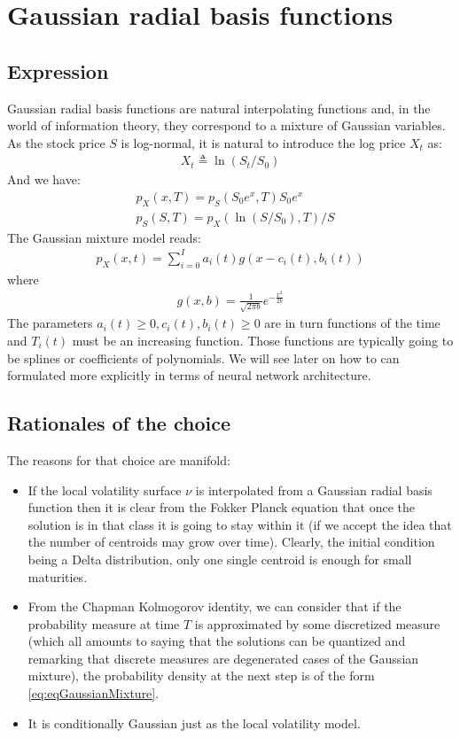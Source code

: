 \documentclass[10pt,a4paper]{article}
\begin{document}
\section{Gaussian radial basis functions}
\subsection{Expression}
Gaussian radial basis functions are natural interpolating functions and, in the world of information theory, they correspond to a mixture of Gaussian variables. 
As the stock price $S$ is log-normal, it is natural to introduce the log price $X_t$ as:
\begin{align}
X_t \triangleq  \ln(S_t/S_0)
\end{align}
And we have:
\begin{align}
&p_X(x,T) = p_S(S_0 e^x,T) S_0 e^x\\
&p_S(S,T) = p_X(\ln(S/S_0),T)/S
\end{align}
The Gaussian mixture model reads:
\begin{align}\label{eq:eqGaussianMixture}
p_X(x,t) = \sum_{i=0}^{I} a_i(t) g(x-c_i(t), b_i(t))
\end{align}
where
\begin{align}
g(x,b) = \frac{1}{\sqrt{2\pi b}} e^{-\frac{x^2}{2b}}
\end{align}
The parameters $a_i(t)\geq 0,c_i(t),b_i(t)\geq 0$ are in turn functions of the time and $T_i(t)$ must be an increasing function. Those functions are typically going to be splines or coefficients of polynomials. We will see later on how to can formulated more explicitly in terms of neural network architecture.

\subsection{Rationales of the choice}
The reasons for that choice are manifold:
\begin{itemize}
\item If the local volatility surface $\nu$ is interpolated from a Gaussian radial basis function then it is clear from the Fokker Planck equation that  once the solution is in that class it is going to stay within it (if we accept the idea that the number of centroids may grow over time). Clearly, the initial condition being a Delta distribution, only one single centroid is enough for small maturities.
\item From the Chapman Kolmogorov identity, we can consider that if the probability measure at time $T$ is approximated by some discretized measure (which all amounts to saying that the solutions can be quantized and remarking that discrete measures are degenerated cases of the Gaussian mixture), the probability density at the next step is of the form \ref{eq:eqGaussianMixture}.
\item It is conditionally Gaussian just as the local volatility model.
\end{itemize}
\end{document}
